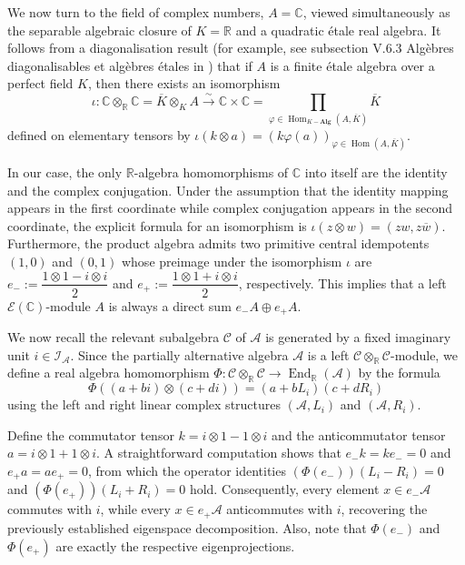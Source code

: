 \documentclass{amsart}
\theoremstyle{definition}
\theoremstyle{plain}
\begin{document}
We now turn to the field of complex numbers, $A=\mathbb{C}$, viewed simultaneously as the separable algebraic closure of 
$K=\mathbb R$ and a quadratic étale real algebra. It follows from a diagonalisation result (for example, see subsection V.6.3 Algèbres diagonalisables et algèbres étales in \cite{Bourbaki}) that if $A$ is a finite étale algebra over a perfect field $K$, then there exists an isomorphism
\[\iota:\mathbb{C}\otimes_{\mathbb R}\mathbb C=\overline{K}\otimes_K A\xrightarrow{\sim}\mathbb{C}\times \mathbb C=\prod_{\varphi\in\operatorname{Hom}_{K-\mathbf{Alg}}(A,\overline{K})}\overline{K}\]
defined on elementary tensors by $\iota(k\otimes a)=(k\varphi(a))_{\varphi\in\operatorname{Hom}(A,\overline{K})}$.
\par\medskip
In our case,  the only $\mathbb R$-algebra homomorphisms of $\mathbb C$ into itself are the identity and the complex conjugation. Under the assumption that the identity mapping appears in the first coordinate while complex conjugation appears in the second coordinate, the explicit formula for an isomorphism is $\iota(z\otimes w)=(zw,z\overline{w})$. Furthermore, the product algebra admits two primitive central idempotents $(1,0)$ and $(0,1)$ whose preimage under the isomorphism $\iota$ are $e_-:=\dfrac{1\otimes 1-i\otimes i}{2}$ and $e_+:=\dfrac{1\otimes 1+i\otimes i}{2}$, respectively. This implies that a left $\mathcal{E}(\mathbb C)$-module $A$ is always a direct sum $e_-A\oplus e_+A$.

We now recall the relevant subalgebra $\mathcal{C}$ of $\mathcal A$ is generated by a fixed imaginary unit $i\in\mathcal{I_A}$. Since the partially alternative algebra $\mathcal{A}$ is a left $\mathcal{C}\otimes_{\mathbb R}\mathcal{C}$-module, we define a real algebra homomorphism $\Phi:\mathcal C\otimes_{\mathbb R}\mathcal C\rightarrow\operatorname{End}_{\mathbb R}(\mathcal{A})$ by the formula $$\Phi((a+bi)\otimes (c+di))=(a+bL_i)(c+dR_i)$$ using the left and right linear complex structures $(\mathcal{A},L_i)$ and $(\mathcal{A},R_i)$.

Define the commutator tensor $k=i\otimes 1-1\otimes i$ and the anticommutator tensor $a=i\otimes 1+1\otimes i$. A straightforward computation shows that $e_-k=ke_-=0$ and $e_+a=ae_+=0$, from which the operator identities $(\Phi(e_-))(L_i-R_i)=0$ and $(\Phi(e_+))(L_i+R_i)=0$ hold. Consequently, every element $x\in e_-\mathcal{A}$ commutes with $i$, while every $x\in e_+\mathcal{A}$ anticommutes with $i$, recovering the previously established eigenspace decomposition. Also, note 
that $\Phi(e_-)$ and $\Phi(e_+)$ are exactly the respective eigenprojections.
\par\medskip
\end{document}

